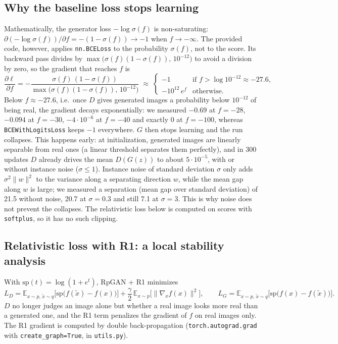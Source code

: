 \subsection{Why the baseline loss stops learning}
\label{app:saturation}
Mathematically, the generator loss $-\log\sigma(f)$ is non-saturating: $\partial(-\log\sigma(f))/\partial f=-(1-\sigma(f))\to-1$ when $f\to-\infty$. The provided code, however, applies \texttt{nn.BCELoss} to the probability $\sigma(f)$, not to the score. Its backward pass divides by $\max\big(\sigma(f)(1-\sigma(f)),\,10^{-12}\big)$ to avoid a division by zero, so the gradient that reaches $f$ is
\begin{equation}
  \frac{\partial \ell}{\partial f}=-\frac{\sigma(f)\,(1-\sigma(f))}{\max\big(\sigma(f)(1-\sigma(f)),\,10^{-12}\big)}
  \;\approx\;
  \begin{cases}
    -1 & \text{if } f>\log 10^{-12}\approx-27.6,\\
    -10^{12}\,e^{f} & \text{otherwise.}
  \end{cases}
\end{equation}
Below $f\approx-27.6$, i.e.\ once $D$ gives generated images a probability below $10^{-12}$ of being real, the gradient decays exponentially: we measured $-0.69$ at $f=-28$, $-0.094$ at $f=-30$, $-4\cdot10^{-6}$ at $f=-40$ and exactly $0$ at $f=-100$, whereas \texttt{BCEWithLogitsLoss} keeps $-1$ everywhere. $G$ then stops learning and the run collapses. This happens early: at initialization, generated images are linearly separable from real ones (a linear threshold separates them perfectly), and in 300 updates $D$ already drives the mean $D(G(z))$ to about $5\cdot10^{-5}$, with or without instance noise ($\sigma\le1$). Instance noise of standard deviation $\sigma$ only adds $\sigma^2\|w\|^2$ to the variance along a separating direction $w$, while the mean gap along $w$ is large; we measured a separation (mean gap over standard deviation) of 21.5 without noise, 20.7 at $\sigma=0.3$ and still 7.1 at $\sigma=3$. This is why noise does not prevent the collapses. The relativistic loss below is computed on scores with \texttt{softplus}, so it has no such clipping.

\subsection{Relativistic loss with R1: a local stability analysis}
\label{app:rpgan}
With $\mathrm{sp}(t)=\log(1+e^t)$, RpGAN + R1 minimizes
\begin{equation}
  L_D=\mathbb E_{x\sim p,\,\tilde x\sim q}\big[\mathrm{sp}\big(f(\tilde x)-f(x)\big)\big]+\frac\gamma2\,\mathbb E_{x\sim p}\big[\|\nabla_x f(x)\|^2\big],
  \qquad
  L_G=\mathbb E_{x\sim p,\,\tilde x\sim q}\big[\mathrm{sp}\big(f(x)-f(\tilde x)\big)\big].
\end{equation}
$D$ no longer judges an image alone but whether a real image looks more real than a generated one, and the R1 term penalizes the gradient of $f$ on real images only. The R1 gradient is computed by double back-propagation (\texttt{torch.autograd.grad} with \texttt{create\_graph=True}, in \texttt{utils.py}).

